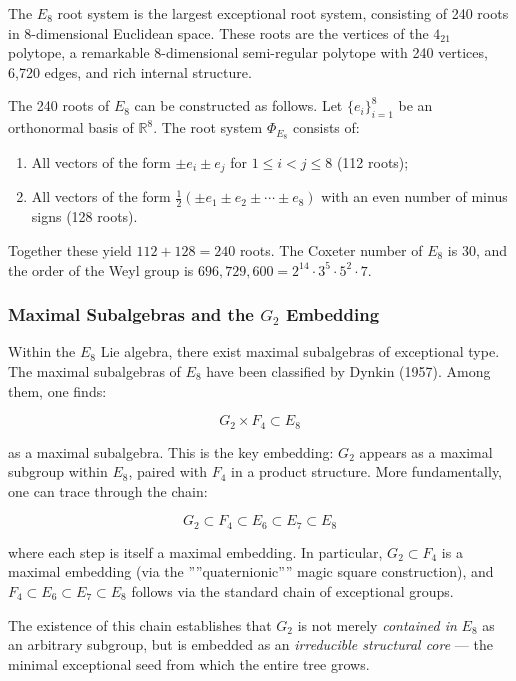 \documentclass[12pt,a4paper]{article}
\begin{document}
The $E_8$ root system is the largest exceptional root system, consisting of 240 roots in 8-dimensional Euclidean space. These roots are the vertices of the $4_{21}$ polytope, a remarkable 8-dimensional semi-regular polytope with 240 vertices, 6,720 edges, and rich internal structure.

The 240 roots of $E_8$ can be constructed as follows. Let $\{e_i\}_{i=1}^8$ be an orthonormal basis of $\mathbb{R}^8$. The root system $\Phi_{E_8}$ consists of:

\begin{enumerate}
    \item All vectors of the form $\pm e_i \pm e_j$ for $1 \leq i < j \leq 8$ (112 roots);
    \item All vectors of the form $\frac{1}{2}(\pm e_1 \pm e_2 \pm \cdots \pm e_8)$ with an even number of minus signs (128 roots).
\end{enumerate}

Together these yield $112 + 128 = 240$ roots. The Coxeter number of $E_8$ is 30, and the order of the Weyl group is $696,729,600 = 2^{14} \cdot 3^5 \cdot 5^2 \cdot 7$.

\subsubsection{Maximal Subalgebras and the $G_2$ Embedding}

Within the $E_8$ Lie algebra, there exist maximal subalgebras of exceptional type. The maximal subalgebras of $E_8$ have been classified by Dynkin (1957). Among them, one finds:

\[G_2 \times F_4 \subset E_8\]

as a maximal subalgebra. This is the key embedding: $G_2$ appears as a maximal subgroup within $E_8$, paired with $F_4$ in a product structure. More fundamentally, one can trace through the chain:

\[G_2 \subset F_4 \subset E_6 \subset E_7 \subset E_8\]

where each step is itself a maximal embedding. In particular, $G_2 \subset F_4$ is a maximal embedding (via the ''''quaternionic'''' magic square construction), and $F_4 \subset E_6 \subset E_7 \subset E_8$ follows via the standard chain of exceptional groups.

The existence of this chain establishes that $G_2$ is not merely \emph{contained in} $E_8$ as an arbitrary subgroup, but is embedded as an \emph{irreducible structural core} --- the minimal exceptional seed from which the entire tree grows.
\end{document}
